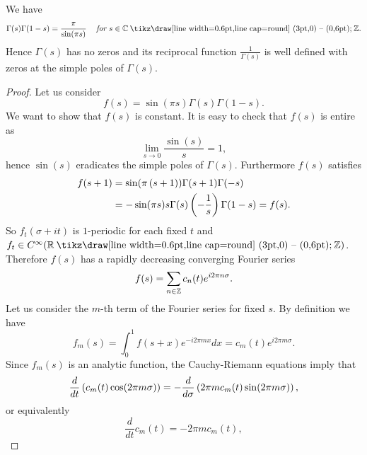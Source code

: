 \begin{theorem}
	We have
\begin{equation*}
	\Gamma(s)\Gamma(1 - s) = \frac{\pi}{\sin(\pi s)} \hsp \textit{  for } s \in \field{C} \mysetminus \field{Z}.
\end{equation*}
	Hence $\Gamma(s)$ has no zeros and its reciprocal function $\frac{1}{\Gamma(s)}$ is well defined with zeros at the simple poles of $\Gamma(s)$.
\end{theorem}
\begin{proof}
	Let us consider
\begin{equation*}
	f(s) = \sin(\pi s) \Gamma(s) \Gamma(1 - s).
\end{equation*}
	We want to show that $f(s)$ is constant. It is easy to check that $f(s)$ is entire as
\begin{equation*}
	\lim\limits_{s \to 0} \frac{\sin(s)}{s} = 1,
\end{equation*}
	hence $\sin(s)$ eradicates the simple poles of $\Gamma(s)$. Furthermore $f(s)$ satisfies
\begin{equation*}
\begin{aligned}
	f(s + 1) 
	&= \sin(\pi \left(s + 1\right)) \Gamma(s + 1) \Gamma(-s) \\ 
	&= -\sin(\pi s) s \Gamma(s) \left(-\frac{1}{s}\right) \Gamma(1 - s) = f(s).
\end{aligned}
\end{equation*}
	So $f_t(\sigma + it)$ is $1$-periodic for each fixed $t$ and $f_t \in C^\infty(\field{R} \mysetminus \field{Z})$. Therefore $f(s)$ has a rapidly decreasing converging Fourier series
\begin{equation*}
	f(s) = \sum _{n \in \mathbb{Z}} c_n(t) e^{i 2 \pi n \sigma}.
\end{equation*}
	Let us consider the $m$-th term of the Fourier series for fixed $s$. By definition we have
\begin{equation*}
	f_m(s) = \int _0 ^1 f(s + x) e^{- i 2 \pi m x} dx = c_m(t) e^{i 2 \pi m \sigma}.
\end{equation*}
	Since $f_m(s)$ is an analytic function, the Cauchy-Riemann equations imply that
\begin{equation*}
	\frac{d}{dt}\left(c_m(t) \cos(2 \pi m \sigma)\right) = - \frac{d}{d\sigma}\left(2 \pi m c_m(t) \sin(2 \pi m \sigma)\right),
\end{equation*}
	or equivalently
\begin{equation*}
	\frac{d}{dt} c_m(t) = -2 \pi m c_m(t),
\end{equation*}

\end{proof}

